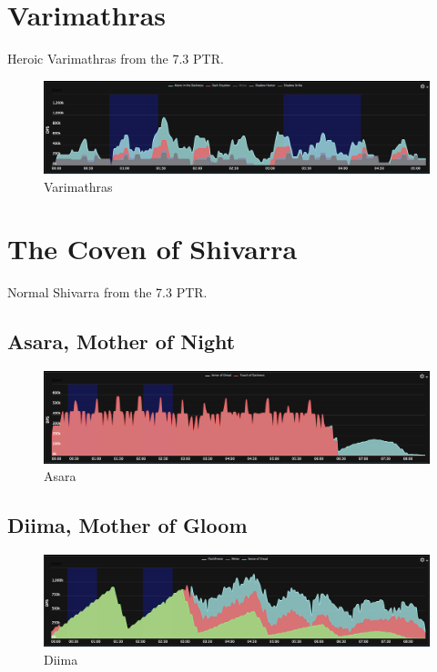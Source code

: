 \documentclass{article}
\begin{document}
\newpage
\section{Varimathras}

Heroic Varimathras from the 7.3 PTR.

\begin{figure}[!htb]
  \includegraphics[width=\linewidth]{08-varimathras.png}
  \caption{Varimathras}
  \label{fig:dmg8}
\end{figure}

\newpage
\section{The Coven of Shivarra}

Normal Shivarra from the 7.3 PTR.

\subsection{Asara, Mother of Night}
\begin{figure}[!htb]
  \includegraphics[width=\linewidth]{09-shivarra-asara.png}
  \caption{Asara}
  \label{fig:dmg9}
\end{figure}

\subsection{Diima, Mother of Gloom}
\begin{figure}[!htb]
  \includegraphics[width=\linewidth]{09-shivarra-diima.png}
  \caption{Diima}
  \label{fig:dmg9}
\end{figure}
\end{document}
